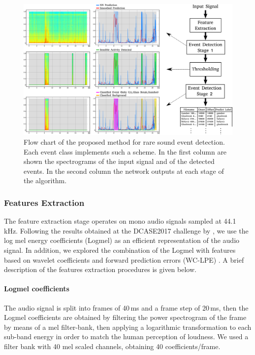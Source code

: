 \begin{figure}[t]
	\centering
	\includegraphics[width=0.9\columnwidth]{img/approccio_finale_1.png}
	\caption[Proposed approach for Rare Sound Event Detection]{Flow chart of the proposed method for rare sound event detection. Each event class implements such a scheme. In the first column are shown the spectrograms of the input signal and of the detected events. In the second column the network outputs at each stage of the algorithm.}
	\label{fig:flow-chart-rare-sed}
\end{figure}

\subsubsection{Features Extraction}
The feature extraction stage operates on mono audio signals sampled at 44.1 kHz. 
Following the results obtained at the DCASE2017 challenge by \cite{cakirconvolutional}, we use the log mel energy coefficients (Logmel) as an efficient representation of the audio signal. In addition, we explored the combination of the Logmel with features based on wavelet coefficients and forward prediction errors (WC-LPE) \cite{marchi2014multi}. A brief description of the features extraction procedures is given below.
\paragraph{Logmel coefficients}
The audio signal is split into frames of 40\,ms and a frame step of 20\,ms, then the Logmel coefficients are obtained by filtering the power spectrogram of the frame by means of a mel filter-bank, then applying a logarithmic  transformation to each sub-band energy in order to match the human perception of loudness. We used a filter bank with 40 mel scaled channels, obtaining 40 coefficients/frame. 

